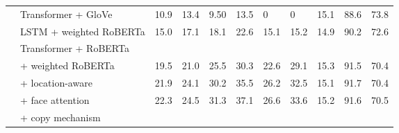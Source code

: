 \begin{table*}[p]
\begin{tabularx}{\textwidth}{llXXXXXX XXX}
      & Transformer + GloVe & 10.9 & 13.4 & 9.50 & 13.5 & 0 & 0 & 15.1 & 88.6 & 73.8 \\
      & LSTM + weighted RoBERTa & 15.0 & 17.1 & 18.1 & 22.6 & 15.1 & 15.2 & 14.9 & 90.2 & 72.6 \\
      \cmidrule{2-11}
      & Transformer + RoBERTa \\
      & \quad + weighted RoBERTa & 19.5 & 21.0 & 25.5 & 30.3 & 22.6 & 29.1 & 15.3 & 91.5 & 70.4 \\
      & \quad\quad + location-aware & 21.9 & 24.1 & 30.2 & 35.5 & 26.2 & 32.5 & 15.1 & 91.7 & 70.4  \\
      & \quad\quad\quad + face attention & 22.3 & 24.5 & 31.3 & 37.1 & 26.6 & 33.6 & 15.2 & 91.6 & 70.5 \\
      & \quad\quad\quad\quad + copy mechanism \\
		\bottomrule
	\end{tabularx}
\end{table*}

\twocolumn

